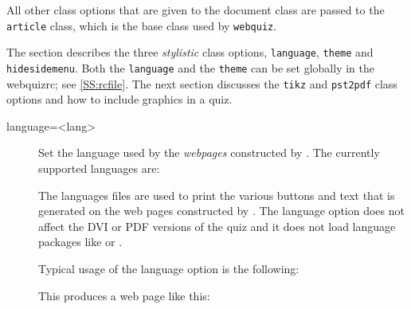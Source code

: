 \documentclass[svgnames]{article}
\newcommand\webquizrc{\index{webquizrc}\textsf{webquizrc}\xspace}
\begin{document}
    All other class options that are given to the \WebQuiz document class
    are passed to the \texttt{article} class, which is the base class used
    by \texttt{webquiz}.

    The section describes the three \textit{stylistic} class options,
    \Verb|language|, \Verb|theme| and \Verb|hidesidemenu|.
    Both the \Verb|language| and the \Verb|theme| can be set globally in
    the \webquizrc; see \autoref{SS:rcfile}.
    The next section discusses the \Verb|tikz| and \Verb|pst2pdf| class
    options and how to include graphics in a quiz.

\begin{description}
  \item[language=<lang>] 
  Set the language used by the \textit{webpages} constructed by \WebQuiz.
  The currently supported languages are:

    \begin{quote}
        
    \end{quote}

    The languages files are used to print the various buttons and text
    that is generated on the web pages constructed by \WebQuiz. The
    \textsf{language} option does not affect the DVI or PDF versions of
    the quiz and it does not load language packages like  or
    .

    Typical usage of the \textsf{language} option is the following:
    
    This produces a web page like this:


\end{description}
\end{document}

